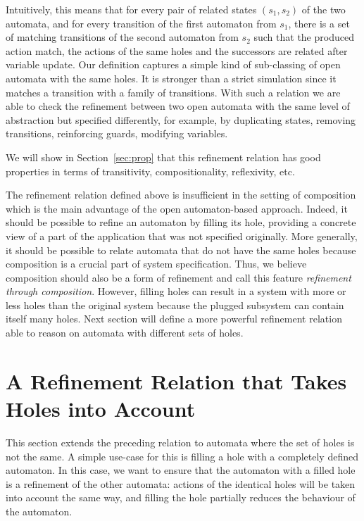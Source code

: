 \documentclass[runningheads]{llncs}
\begin{document}
Intuitively, this means that for every pair of related
states $(s_1,s_2)$  of the two automata, and for every  transition of the first automaton from $s_1$, there is a set of matching transitions  of the second automaton  from $s_2$ such that the produced action match, the actions of the same holes and the successors are related after variable update. Our definition captures a simple kind of sub-classing of open automata with the same holes. It is stronger than a strict simulation since it matches a transition with a family of transitions. 
With such a relation we are able to check the refinement between two open automata with the same level of abstraction but specified differently, for example, by duplicating states, removing transitions,  reinforcing  guards, modifying variables. 


 We will show in Section~\ref{sec:prop} that this refinement relation has good properties in terms of transitivity, compositionality, reflexivity, etc.

The refinement relation defined above is insufficient in the setting of composition which is the main advantage of the open automaton-based approach. Indeed, it should be possible to refine an automaton by filling its hole, providing a concrete view of a part of the application that was not specified originally. 
More generally, it should be possible to relate automata that do not have the same holes because composition is a crucial part of system specification.
Thus, we believe composition should also be a form of refinement and call this feature \emph{refinement through composition}.
However, filling holes can result in a system with more or less holes than the original system because the plugged subsystem can contain itself many holes.
Next section will define  a more powerful refinement relation able to reason on automata with different sets of holes.







\section{A Refinement Relation that Takes Holes into Account}\label{sec:holes}

This section  extends the preceding relation to automata where the set of holes is not the same. A simple use-case for this is filling a hole with a completely defined automaton. In this case, we want to ensure that the automaton with a filled hole is a refinement of the other automata: actions of the identical holes will be taken into account the same way, and filling the hole partially reduces the behaviour of the automaton.
\end{document}
